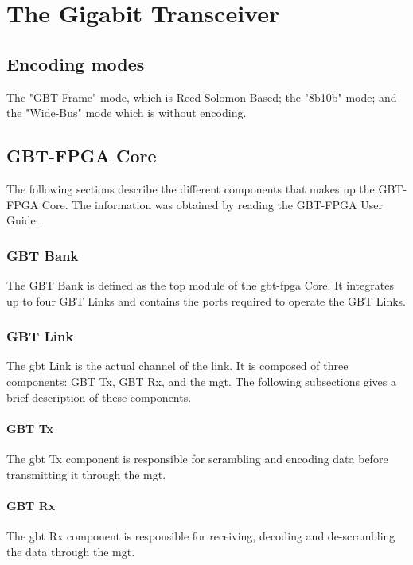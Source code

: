 \documentclass[main.tex]{subfiles}
\begin{document}
\chapter{The Gigabit Transceiver} \label{chap:gbt}


\section{Encoding modes}

The "GBT-Frame" mode, which is Reed-Solomon Based; the "8b10b" mode; and the "Wide-Bus" mode which is without encoding.

\section{GBT-FPGA Core}
The following sections describe the different components that makes up the GBT-FPGA Core. The information was obtained by reading the GBT-FPGA User Guide \cite{gbt_fpga}.

\subsection{GBT Bank}
The GBT Bank is defined as the top module of the \gls{gbt}-\gls{fpga} Core. It integrates up to four GBT Links and contains the ports required to operate the GBT Links.

\subsection{GBT Link}
The \gls{gbt} Link is the actual channel of the link. It is composed of three components: GBT Tx, GBT Rx, and the \gls{mgt}. The following subsections gives a brief description of these components.

\subsubsection{GBT Tx}

The \gls{gbt} Tx component is responsible for scrambling and encoding data before transmitting it through the \gls{mgt}.

\subsubsection{GBT Rx}

The \gls{gbt} Rx component is responsible for receiving, decoding and de-scrambling the data through the \gls{mgt}.
\end{document}
